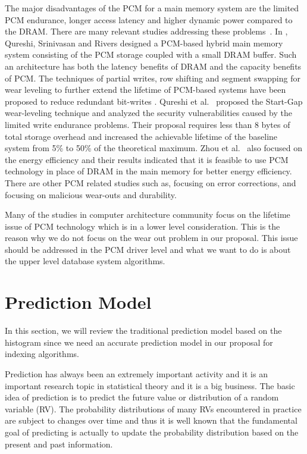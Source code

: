 The major disadvantages of the PCM for
a main memory system are the limited PCM endurance,
longer access latency and
higher dynamic power compared to the DRAM.
There are many relevant studies addressing these
problems~\cite{qureshi2009scalable,zhou2009durable,lee2009architecting,qureshi2009enhancing}.
In \cite{qureshi2009scalable},
Qureshi, Srinivasan and Rivers
designed a PCM-based hybrid main memory system
consisting of the PCM storage coupled with
a small DRAM buffer.
Such an architecture has both the
latency benefits of DRAM and the capacity
benefits of PCM.
The techniques of partial writes,
row shifting and segment swapping
for wear leveling to
further extend the lifetime of PCM-based
systems have been proposed to
reduce redundant bit-writes \cite{zhou2009durable,lee2009architecting}.
Qureshi et al.~\cite{qureshi2009enhancing}
proposed the Start-Gap wear-leveling
technique and analyzed the security
vulnerabilities caused by the limited write endurance problems.
Their proposal requires less than 8 bytes of total storage overhead
and increased the achievable lifetime of the baseline system
from 5\% to 50\% of the theoretical maximum.
Zhou et al.~\cite{zhou2009durable} also
focused on the energy efficiency
and their results indicated that it is feasible to
use PCM technology in place of DRAM
in the main memory for better energy efficiency.
There are other PCM related studies
such as,
\cite{schechter2010use} focusing on
error corrections,
and \cite{seong2010security} focusing
on malicious wear-outs and durability.

Many of the studies in computer architecture community focus on the lifetime issue of PCM 
technology which is in a lower level consideration. This is the reason why we do not focus
on the wear out problem in our proposal. This issue should be addressed in the PCM driver level
and what we want to do is about the upper level database system algorithms. 

\section{Prediction Model}
In this section, we will review the traditional prediction model based on the histogram since we need an
accurate prediction model in our proposal for indexing algorithms.

Prediction has always been an extremely important activity and it is an important research topic in statistical
theory and it is a big business. The basic idea of prediction is to predict the future value or distribution
of a random variable (RV). The probability distributions of many RVs encountered in practice are subject to
changes over time and thus it is well known that the fundamental goal of predicting is actually to update the
probability distribution based on the present and past information.

